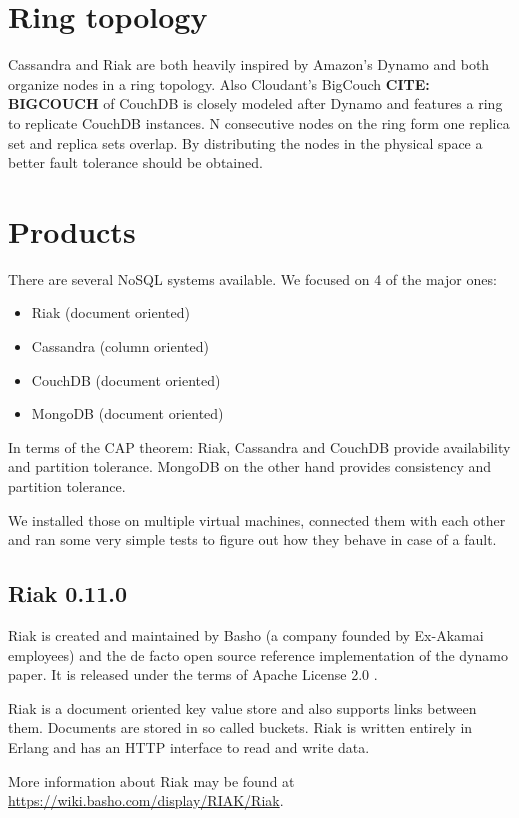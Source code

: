 \documentclass{llncs}
\begin{document}
\section{Ring topology}

Cassandra and Riak are both heavily inspired by Amazon's Dynamo and
both organize nodes in a ring topology. Also Cloudant's BigCouch
\textbf{CITE: BIGCOUCH} of CouchDB is closely modeled after Dynamo
and features a ring to replicate CouchDB instances. N consecutive
nodes on the ring form one replica set and replica sets overlap. By
distributing the nodes in the physical space a better fault
tolerance should be obtained.

\section{Products}

There are several NoSQL systems available. We focused on 4 of the
major ones:

\begin{itemize}
\item
  Riak (document oriented)
\item
  Cassandra (column oriented)
\item
  CouchDB (document oriented)
\item
  MongoDB (document oriented)
\end{itemize}
In terms of the CAP theorem: Riak, Cassandra and CouchDB provide
availability and partition tolerance. MongoDB on the other hand
provides consistency and partition tolerance.

We installed those on multiple virtual machines, connected them
with each other and ran some very simple tests to figure out how
they behave in case of a fault.

\subsection{Riak 0.11.0}

Riak is created and maintained by Basho (a company founded by
Ex-Akamai employees) and the de facto open source reference
implementation of the dynamo paper. It is released under the terms
of Apache License 2.0 .

Riak is a document oriented key value store and also supports links
between them. Documents are stored in so called buckets. Riak is
written entirely in Erlang and has an HTTP interface to read and
write data.

More information about Riak may be found at
\url{https://wiki.basho.com/display/RIAK/Riak}.
\end{document}
